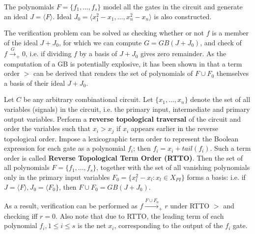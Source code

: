 \vspace{-0.15in}
The polynomials $F = \{f_1,\dots,f_s\}$ model all the gates in the circuit
and generate an ideal $J = \langle F \rangle$. Ideal $J_0 = \langle
x_1^2-x_1,\dots,x_n^2-x_n \rangle$ is also constructed.

The verification problem can be solved as checking whether or not $f$
is a member of the ideal $J + J_0$, for which we can compute $G =
GB(J+J_0)$, and check of $f \xrightarrow{G}_+ 0$, i.e. if dividing $f$
by a \Grobner basis of $J+J_0$ gives zero remainder. As the
computation of a GB is potentially explosive, it has been shown in
\cite{lv:tcad2013} \cite{kauffman2017} that a term order $>$ can be
derived that renders the set of polynomials of $F \cup  F_0$ themselves a
\Grobner basis of their ideal $J+J_0$. 

\begin{Fact}
Let $C$ be any arbitrary combinational circuit. Let $\{x_1, \dots , x_n\}$ denote
the set of all variables (signals) in the circuit, i.e. the primary input, intermediate and
primary output variables. Perform a \textbf{reverse topological traversal} of the circuit and
order the variables such that $x_i > x_j$ if $x_i$ appears earlier in the reverse topological
order. Impose a lexicographic term order to represent the Boolean expression for each gate as a
polynomial $f_i$; then $f_i = x_i+tail(f_i)$. Such a term order is
called \textbf{Reverse Topological Term Order (RTTO)}.
Then the set of all polynomials $F = \{f_1, \dots , f_s\}$, together
with the set of all vanishing polynomials only in the primary input
variables $F_0 = \{x_l^2-x_l: x_l \in X_{PI}\}$ forms a \Grobner
basis: i.e. if $J = \langle F \rangle, J_0 = \langle F_0\}$, then $F
\cup F_0 = GB(J+J_0)$. 
\end{Fact}

As a result, verification can be performed as $f \xrightarrow{F\cup
  F_0}_+ r$ under RTTO $>$ and checking iff $r = 0$. Also note that
due to RTTO, the leading term of each polynomial $f_i, 1\leq i \leq s$
is the net $x_i$, corresponding to the output of the $f_i$ gate. 


